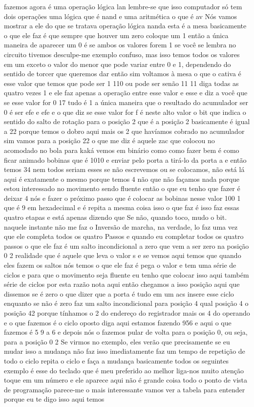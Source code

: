 \documentclass[oneside,11pt]{memoir} %
\begin{document}
fazemos agora é uma operação  lógica lan lembre-se que isso  computador só tem dois  operações uma lógica que é nand e uma  aritmética o que é av  Nós vamos mostrar a ele do que se tratava  operação lógica nanda esta é a mesa  basicamente o que ele faz é que  sempre que houver um zero coloque um 1  então a única maneira de aparecer um  0 é se ambos os valores forem 1  se você se lembra no circuito  tivemos  desculpe-me exemplo confuso, mas isso  temos todos os valores em um exceto  o valor do menor que pode variar  entre 0 e 1, dependendo do sentido de  torcer que queremos dar então sim  voltamos à mesa  o que o cativa é esse valor que  temos que pode ser 1 110 ou pode ser  senão 11 11 diga todas as quatro vezes 1  e ele faz apenas a operação  entre esse valor e esse  e diz a você que se esse valor for 0 17 tudo  é 1 a única maneira que o resultado do  acumulador ser 0 é ser  efe e efe  e o que diz se esse valor for f  é neste alto valor o bit que  indica o sentido do salto de rotação para o  posição 2 que é a posição  2 basicamente é igual a 22 porque  temos o dobro aqui mais os 2 que  havíamos cobrado no acumulador sim  vamos para a posição 22 o que me diz é  aquele zac que colocou no acomodado no  bola para kaká vemos em binário como  como fazer bem é como ficar animado  bobinas que é 1010 e enviar pelo  porta a tirá-lo da porta a e  então temos 34 nem todos seriam esses  se não escrevemos ou se colocamos, não está lá  aqui é exatamente o mesmo  porque temos 4 não que não façamos nada  porque estou interessado no movimento sendo  fluente então o que eu tenho que fazer  é deixar 4 nós e fazer o próximo passo  que é colocar as bobinas nesse valor  100 1 que é 9 em hexadecimal e é  repita a mesma coisa isso o que faz é isso faz  essas quatro etapas e está apenas dizendo que  Se não, quando toco, mudo o bit.  naquele instante não me faz o  Inversão de marcha, na verdade, lo  faz uma vez que ele completa todos os quatro  Passos  e quando eu completar todos os quatro  passos o que ele faz é um salto  incondicional a zero que vem a ser  zero na posição 0 2 realidade que é  aquele que leva o valor s e se vemos aqui  temos que quando eles fazem os saltos  nós temos o que ele faz é  pega o valor e tem uma série de  ciclos e para que o movimento seja  fluente eu tenho que colocar isso aqui também  série de ciclos por esta razão  nota aqui  então chegamos a isso  posição aqui que dissemos se é zero  o que dizer que a porta é tudo em um  acs insere esse ciclo enquanto se  não é zero faz um salto incondicional para  posição 4 qual posição 4 o  posição 42 porque tínhamos o 2 do  endereço do registrador mais os 4 do operando  e o que fazemos é o ciclo oposto  diga aqui estamos fazendo 956 e aqui  o que fazemos é 5 9 a 6 e depois  nós o fazemos pular de volta para o  posição 0, ou seja, para a posição 0 2  Se virmos no exemplo, eles verão que  precisamente se eu mudar isso a mudança  não faz isso imediatamente faz um  tempo de repetição de todo o ciclo  repita o ciclo e faça a mudança  basicamente todos os seguintes  exemplo é esse do teclado que é meu  preferido ao melhor liga-nos muito  atenção toque em um número e ele aparece  aqui não é grande coisa todo o ponto de  vista de programação parece-me o  mais interessante vamos ver a tabela  para entender porque eu te digo isso  aqui temos 
\end{document}
